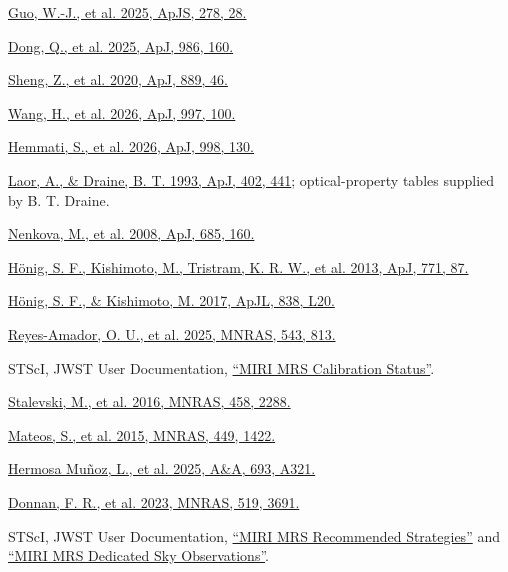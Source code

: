 \documentclass[12pt]{article}
\begin{document}
\noindent [32] \href{https://arxiv.org/abs/2408.00402}{Guo, W.-J., et al. 2025, ApJS, 278, 28.}\par
\noindent [33] \href{https://arxiv.org/abs/2408.07335}{Dong, Q., et al. 2025, ApJ, 986, 160.}\par
\noindent [34] \href{https://doi.org/10.3847/1538-4357/ab5af9}{Sheng, Z., et al. 2020, ApJ, 889, 46.}\par
\noindent [35] \href{https://doi.org/10.3847/1538-4357/ae1fdc}{Wang, H., et al. 2026, ApJ, 997, 100.}\par
\noindent [36] \href{https://doi.org/10.3847/1538-4357/ae38b8}{Hemmati, S., et al. 2026, ApJ, 998, 130.}\par
\noindent [37] \href{https://doi.org/10.1086/172149}{Laor, A., \& Draine, B. T. 1993, ApJ, 402, 441}; optical-property tables supplied by B. T. Draine.\par
\noindent [38] \href{https://arxiv.org/abs/0806.0512}{Nenkova, M., et al. 2008, ApJ, 685, 160.}\par
\noindent [39] \href{https://arxiv.org/abs/1306.4312}{H\"onig, S. F., Kishimoto, M., Tristram, K. R. W., et al. 2013, ApJ, 771, 87.}\par
\noindent [40] \href{https://doi.org/10.3847/2041-8213/aa6838}{H\"onig, S. F., \& Kishimoto, M. 2017, ApJL, 838, L20.}\par
\noindent [41] \href{https://doi.org/10.1093/mnras/staf1494}{Reyes-Amador, O. U., et al. 2025, MNRAS, 543, 813.}\par
\noindent [42] STScI, JWST User Documentation, \href{https://jwst-docs.stsci.edu/jwst-calibration-status/miri-calibration-status/miri-mrs-calibration-status}{``MIRI MRS Calibration Status''}.\par
\noindent [43] \href{https://doi.org/10.1093/mnras/stw444}{Stalevski, M., et al. 2016, MNRAS, 458, 2288.}\par
\noindent [44] \href{https://doi.org/10.1093/mnras/stv299}{Mateos, S., et al. 2015, MNRAS, 449, 1422.}\par
\noindent [45] \href{https://doi.org/10.1051/0004-6361/202452437}{Hermosa Mu\~noz, L., et al. 2025, A\&A, 693, A321.}\par
\noindent [46] \href{https://academic.oup.com/mnras/article/519/3/3691/6948335}{Donnan, F. R., et al. 2023, MNRAS, 519, 3691.}\par
\noindent [47] STScI, JWST User Documentation, \href{https://jwst-docs.stsci.edu/jwst-mid-infrared-instrument/miri-observing-strategies/miri-mrs-recommended-strategies}{``MIRI MRS Recommended Strategies''} and \href{https://jwst-docs.stsci.edu/jwst-mid-infrared-instrument/miri-operations/miri-dithering/miri-mrs-dedicated-sky-observations}{``MIRI MRS Dedicated Sky Observations''}.\par
\end{document}
